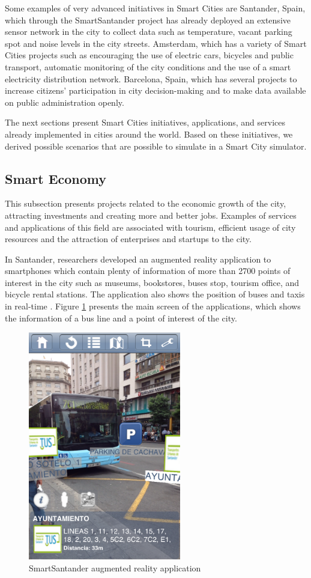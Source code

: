 Some examples of very advanced initiatives in Smart Cities are Santander, Spain, which through the SmartSantander project has already deployed an extensive sensor network in the city to collect data such as temperature, vacant parking spot and noise levels in the city streets. Amsterdam, which has a variety of Smart Cities projects such as encouraging the use of electric cars, bicycles and public transport, automatic monitoring of the city conditions and the use of a smart electricity distribution network. Barcelona, Spain, which has several projects to increase citizens' participation in city decision-making and to make data available on public administration openly.

The next sections present Smart Cities initiatives, applications, and services already implemented in cities around the world. Based on these initiatives, we derived possible scenarios that are possible to simulate in a Smart City simulator.

\subsection{Smart Economy}

This subsection presents projects related to the economic growth of the city, attracting investments and creating more and better jobs. Examples of services and applications of this field are associated with tourism, efficient usage of city resources and the attraction of enterprises and startups to the city. 

In Santander, researchers developed an augmented reality application to smartphones which contain plenty of information of more than 2700 points of interest in the city such as museums, bookstores, buses stop, tourism office, and bicycle rental stations. The application also shows the position of buses and taxis in real-time \citep{sanchez2014smartsantander}. Figure \ref{figure:santanderRa} presents the main screen of the applications, which shows the information of a bus line and a point of interest of the city.

\begin{figure}[!htb]
\centering
\includegraphics[height=10cm]{figuras/santanderRA}
\caption{SmartSantander augmented reality application}
\label{figure:santanderRa}
\end{figure}


